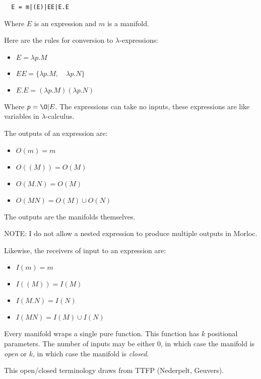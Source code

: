 \documentclass[12pt]{article}
\begin{document}
\begin{verbatim}
  E = m|(E)|EE|E.E
\end{verbatim}

Where $E$ is an expression and $m$ is a manifold.

Here are the rules for conversion to $\lambda$-expressions:

\begin{itemize}
  \item $E = \lambda p . M$
  \item $EE = \{ \lambda p . M, \quad \lambda p . N \}$
  \item $E.E = ( \lambda p . M ) ( \lambda p . N )$
\end{itemize}

Where $p = \O | E$. The expressions can take no inputs, these expressions are
like variables in $\lambda$-calculus.

The outputs of an expression are:

\begin{itemize}
  \item $O(m) = m$
  \item $O( (M) ) = O(M)$
  \item $O(M.N) = O(M)$
  \item $O(MN) = O(M) \cup O(N)$
\end{itemize}

The outputs are the manifolds themselves.

NOTE: I do not allow a nested expression to produce multiple outputs in Morloc.

Likewise, the receivers of input to an expression are:

\begin{itemize}
  \item $I(m) = m$
  \item $I( (M) ) = I(M)$
  \item $I(M.N) = I(N)$
  \item $I(MN) = I(M) \cup I(N)$
\end{itemize}

Every manifold wraps a single pure function. This function has $k$ positional
parameters. The number of inputs may be either 0, in which case the manifold is
\textit{open} or $k$, in which case the manifold is \textit{closed}.

This open/closed terminology draws from TTFP (Nederpelt, Geuvers).
\end{document}
